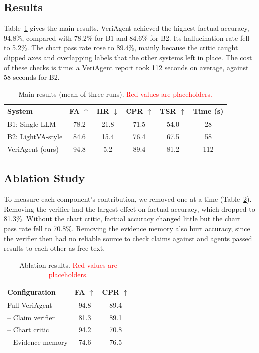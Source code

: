 \documentclass[conference]{IEEEtran}
\newcommand{\res}[1]{\textcolor{red}{#1}}
\newcommand{\FAbaseA}{\res{78.2}}    %
\newcommand{\FAbaseB}{\res{84.6}}    %
\newcommand{\FAfull}{\res{94.8}}     %
\newcommand{\HRbaseA}{\res{21.8}}    %
\newcommand{\HRbaseB}{\res{15.4}}    %
\newcommand{\HRfull}{\res{5.2}}      %
\newcommand{\CPRbaseA}{\res{71.5}}   %
\newcommand{\CPRbaseB}{\res{76.4}}   %
\newcommand{\CPRfull}{\res{89.4}}    %
\newcommand{\TSRbaseA}{\res{54.0}}   %
\newcommand{\TSRbaseB}{\res{67.5}}   %
\newcommand{\TSRfull}{\res{81.2}}    %
\newcommand{\TIMEbaseA}{\res{28}}    %
\newcommand{\TIMEbaseB}{\res{58}}    %
\newcommand{\TIMEfull}{\res{112}}    %
\newcommand{\FAnoVer}{\res{81.3}}    %
\newcommand{\CPRnoVer}{\res{89.1}}   %
\newcommand{\FAnoCrit}{\res{94.2}}   %
\newcommand{\CPRnoCrit}{\res{70.8}}  %
\newcommand{\FAnoMem}{\res{74.6}}    %
\newcommand{\CPRnoMem}{\res{76.5}}   %
\renewcommand{\res}[1]{#1}   %
\begin{document}
\subsection{Results}
Table~\ref{tab:main} gives the main results. %
VeriAgent achieved the highest factual accuracy, \FAfull{}\%, compared with \FAbaseA{}\% for B1 and \FAbaseB{}\% for B2. Its hallucination rate fell to \HRfull{}\%. The chart pass rate rose to \CPRfull{}\%, mainly because the critic caught clipped axes and overlapping labels that the other systems left in place. The cost of these checks is time: a VeriAgent report took \TIMEfull{} seconds on average, against \TIMEbaseB{} seconds for B2.

\begin{table}[t]
\centering
\caption{Main results (mean of three runs). \textcolor{red}{Red values are placeholders.}}
\label{tab:main}
\setlength{\tabcolsep}{3.5pt}
\begin{tabular}{@{}lccccc@{}}
\toprule
System & FA $\uparrow$ & HR $\downarrow$ & CPR $\uparrow$ & TSR $\uparrow$ & Time (s) \\
\midrule
B1: Single LLM   & \FAbaseA{} & \HRbaseA{} & \CPRbaseA{} & \TSRbaseA{} & \TIMEbaseA{} \\
B2: LightVA-style & \FAbaseB{} & \HRbaseB{} & \CPRbaseB{} & \TSRbaseB{} & \TIMEbaseB{} \\
VeriAgent (ours) & \FAfull{} & \HRfull{} & \CPRfull{} & \TSRfull{} & \TIMEfull{} \\
\bottomrule
\end{tabular}
\end{table}

\subsection{Ablation Study}
To measure each component's contribution, we removed one at a time (Table~\ref{tab:ablation}). Removing the verifier had the largest effect on factual accuracy, which dropped to \FAnoVer{}\%. Without the chart critic, factual accuracy changed little but the chart pass rate fell to \CPRnoCrit{}\%. Removing the evidence memory also hurt accuracy, since the verifier then had no reliable source to check claims against and agents passed results to each other as free text. %

\begin{table}[t]
\centering
\caption{Ablation results. \textcolor{red}{Red values are placeholders.}}
\label{tab:ablation}
\begin{tabular}{@{}lcc@{}}
\toprule
Configuration & FA $\uparrow$ & CPR $\uparrow$ \\
\midrule
Full VeriAgent                 & \FAfull{} & \CPRfull{} \\
\quad -- Claim verifier        & \FAnoVer{} & \CPRnoVer{} \\
\quad -- Chart critic          & \FAnoCrit{} & \CPRnoCrit{} \\
\quad -- Evidence memory       & \FAnoMem{} & \CPRnoMem{} \\
\bottomrule
\end{tabular}
\end{table}
\end{document}
